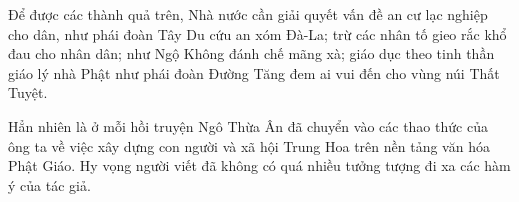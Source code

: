 Để được các thành quả trên, Nhà nước cần giải quyết vấn đề an cư lạc nghiệp cho dân, như phái đoàn Tây Du cứu an xóm Đà-La; trừ các nhân tố gieo rắc khổ đau cho nhân dân; như Ngộ Không đánh chế mãng xà; giáo dục theo tinh thần giáo lý nhà Phật như phái đoàn Đường Tăng đem ai vui đến cho vùng núi Thất Tuyệt.

Hẳn nhiên là ở mỗi hồi truyện Ngô Thừa Ân đã chuyển vào các thao thức của ông ta về việc xây dựng con người và xã hội Trung Hoa trên nền tảng văn hóa Phật Giáo. Hy vọng người viết đã không có quá nhiều tưởng tượng đi xa các hàm ý của tác giả.
